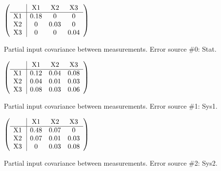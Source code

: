 \begin{table}[H]
\scriptsize
\begin{center}
\renewcommand{\arraystretch}{1.1}
\begin{math}\left(\begin{array}{c|ccc}
 & \mathrm{X1} & 
\mathrm{X2} & 
\mathrm{X3} \\
\hline
\mathrm{X1} \hspace*{2pt} &       0.18 &  0 &  0 \\
\mathrm{X2} \hspace*{2pt} &  0 &       0.03 &  0 \\
\mathrm{X3} \hspace*{2pt} &  0 &  0 &       0.04 \\
\end{array}\right)\end{math}
\caption{Partial input covariance between measurements. Error source \#0: Stat.}
\renewcommand{\arraystretch}{1}
\end{center}
\end{table}
\begin{table}[H]
\scriptsize
\begin{center}
\renewcommand{\arraystretch}{1.1}
\begin{math}\left(\begin{array}{c|ccc}
 & \mathrm{X1} & 
\mathrm{X2} & 
\mathrm{X3} \\
\hline
\mathrm{X1} \hspace*{2pt} &       0.12 &       0.04 &       0.08 \\
\mathrm{X2} \hspace*{2pt} &       0.04 &       0.01 &       0.03 \\
\mathrm{X3} \hspace*{2pt} &       0.08 &       0.03 &       0.06 \\
\end{array}\right)\end{math}
\caption{Partial input covariance between measurements. Error source \#1: Sys1.}
\renewcommand{\arraystretch}{1}
\end{center}
\end{table}
\begin{table}[H]
\scriptsize
\begin{center}
\renewcommand{\arraystretch}{1.1}
\begin{math}\left(\begin{array}{c|ccc}
 & \mathrm{X1} & 
\mathrm{X2} & 
\mathrm{X3} \\
\hline
\mathrm{X1} \hspace*{2pt} &       0.48 &       0.07 &  0 \\
\mathrm{X2} \hspace*{2pt} &       0.07 &       0.01 &       0.03 \\
\mathrm{X3} \hspace*{2pt} &  0 &       0.03 &       0.08 \\
\end{array}\right)\end{math}
\caption{Partial input covariance between measurements. Error source \#2: Sys2.}
\renewcommand{\arraystretch}{1}
\end{center}
\end{table}
